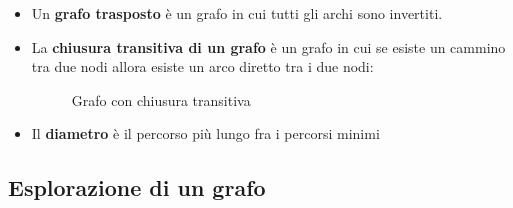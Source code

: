 \documentclass[a4paper]{article}
\begin{document}
\noindent
\begin{itemize}
  \item Un \textbf{grafo trasposto} è un grafo in cui tutti gli archi sono invertiti.

  \item
    La \textbf{chiusura transitiva di un grafo} è un grafo in cui se esiste un cammino tra due nodi
    allora esiste un arco diretto tra i due nodi:
    \begin{figure}[H]
      \centering
      \caption{Grafo con chiusura transitiva}
    \end{figure}

  \item Il \textbf{diametro} è il percorso più lungo fra i percorsi minimi
\end{itemize}

\subsection{Esplorazione di un grafo}
\end{document}
